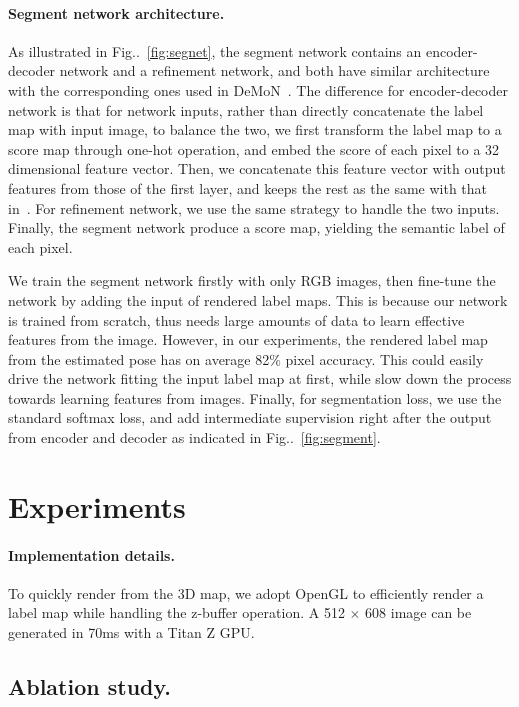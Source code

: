 \documentclass[10pt,twocolumn,letterpaper]{article}
\makeatletter
\newcommand{\figref}[1]{Fig\onedot~\ref{#1}}
\DeclareRobustCommand\onedot{\futurelet\@let@token\@onedot}
\def\onedot{\ifx\@let@token.\else.\null\fi\xspace}
\makeatother
\begin{document}
\paragraph{Segment network architecture.} As illustrated in \figref{fig:segnet}, the segment network contains an encoder-decoder network and a refinement network, and both have similar architecture with the corresponding ones used in DeMoN~\cite{ummenhofer2016demon}. 
The difference for encoder-decoder network is that for network inputs, rather than directly concatenate the label map with input image, to balance the two, we first transform the label map to a score map through one-hot operation, and embed the score of each pixel to a 32 dimensional feature vector. Then, we concatenate this feature vector with output features from those of the first layer, and keeps the rest as the same with that in~\cite{ummenhofer2016demon}. For refinement network, we use the same strategy to handle the two inputs. Finally, the segment network produce a score map, yielding the semantic label of each pixel.

We train the segment network firstly with only RGB images, then fine-tune the network by adding the input of rendered label maps. This is because our network is trained from scratch, thus needs large amounts of data to learn effective features from the image. However, in our experiments, the rendered label map from the estimated pose has on average 82$\%$ pixel accuracy. This could easily drive the network fitting the input label map at first, while slow down the process towards learning features from images. Finally, for segmentation loss, we use the standard softmax loss, and add intermediate supervision right after the output from encoder and decoder as indicated in \figref{fig:segment}.


\section{Experiments}
\label{sec:experiments}
\paragraph{Implementation details.} To quickly render from the 3D map, we adopt OpenGL to efficiently render a label map while handling the z-buffer operation. A 512 $\times$ 608 image can be generated in 70ms with a Titan Z GPU. 

\subsection{Ablation study.}
\end{document}
